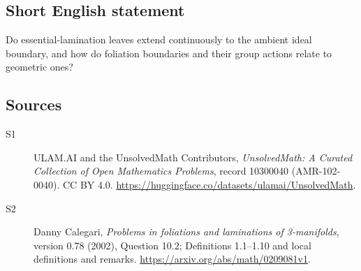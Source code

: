 \documentclass[11pt]{article}
\begin{document}
\subsection{Short English statement}
Do essential-lamination leaves extend continuously to the ambient ideal boundary, and how do foliation boundaries and their group actions relate to geometric ones?
\subsection{Sources}
\begin{description}
\item[\hypertarget{source:10300040:1}{S1}] ULAM.AI and the UnsolvedMath Contributors, \emph{UnsolvedMath: A Curated Collection of Open Mathematics Problems}, record 10300040 (AMR-102-0040). CC BY 4.0. \url{https://huggingface.co/datasets/ulamai/UnsolvedMath}.
\item[\hypertarget{source:10300040:2}{S2}] Danny Calegari, \emph{Problems in foliations and laminations of 3-manifolds}, version 0.78 (2002), Question 10.2; Definitions 1.1--1.10 and local definitions and remarks. \url{https://arxiv.org/abs/math/0209081v1}.
\end{description}
\label{end:10300040}
\end{document}

